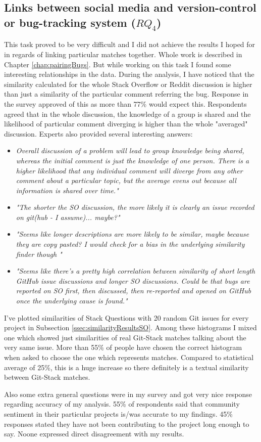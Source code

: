\subsection{Links between social media and version-control or bug-tracking system ($RQ_{4}$)}
This task proved to be very difficult and I did not achieve the results I hoped for in regards of linking particular matches together. Whole work is described in Chapter \ref{chap:pairingBugs}. But while working on this task I found some interesting relationships in the data. During the analysis, I have noticed that the similarity calculated for the whole Stack Overflow or Reddit discussion is higher than just a similarity of the particular comment referring the bug. Response in the survey approved of this as more than 77\% would expect this. Respondents agreed that in the whole discussion, the knowledge of a group is shared and the likelihood of particular comment diverging is higher than the whole "averaged" discussion. Experts also provided several interesting answers:
\begin{itemize}
\item \textit{Overall discussion of a problem will lead to group knowledge being shared, whereas the initial comment is just the knowledge of one person. There is a higher likelihood that any individual comment will diverge from any other comment about a particular topic, but the average evens out because all information is shared over time."}
\item \textit{"The shorter the SO discussion, the more likely it is clearly an issue recorded on git(hub - I assume)... maybe?"}
\item \textit{"Seems like longer descriptions are more likely to be similar, maybe because they are copy pasted? I would check for a bias in the underlying similarity finder though
"}
\item \textit{"Seems like there's a pretty high correlation between similarity of short length GitHub issue discussions and longer SO discussions. Could be that bugs are reported on SO first, then discussed, then re-reported and opened on GitHub once the underlying cause is found."}
\end{itemize} 
I've plotted similarities of Stack Questions with 20 random Git issues for every project in Subsection \ref{ssec:similarityResultsSO}. Among these histograms I mixed one which showed just similarities of real Git-Stack matches talking about the very same issue. More than 55\% of people have chosen the correct histogram when asked to choose the one which represents matches. Compared to statistical average of 25\%, this is a huge increase so there definitely is a textual similarity between Git-Stack matches.


Also some extra general questions were in my survey and got very nice response regarding accuracy of my analysis. 55\% of respondents said that community sentiment in their particular projects is/was accurate to my findings. 45\% responses stated they have not been contributing to the project long enough to say. Noone expressed direct disagreement with my results.